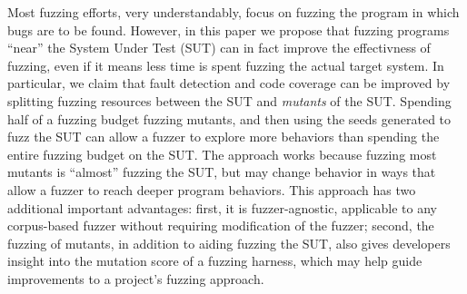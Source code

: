 Most fuzzing efforts, very understandably, focus on fuzzing the program
in which bugs are to be found.  However, in this paper we propose that
fuzzing programs ``near'' the System Under Test (SUT) can in fact
improve the effectivness of fuzzing, even if it means less time is
spent fuzzing the actual target system.  In particular, we claim that
fault detection and code coverage can be improved by splitting fuzzing
resources between the SUT and \emph{mutants} of the SUT.  Spending
half of a fuzzing budget fuzzing mutants, and then using the seeds
generated to fuzz the SUT can allow a fuzzer to explore more behaviors
than spending the entire fuzzing budget on the SUT.  The approach
works because fuzzing most mutants is ``almost'' fuzzing the SUT, but
may change behavior in ways that allow a fuzzer to reach deeper
program behaviors.  This approach has two additional important advantages:
first, it is fuzzer-agnostic, applicable to any corpus-based fuzzer
without requiring modification of the fuzzer; second, the fuzzing of
mutants, in addition to aiding fuzzing the SUT, also gives developers
insight into the mutation score of a fuzzing harness, which may help
guide improvements to a project's fuzzing approach.